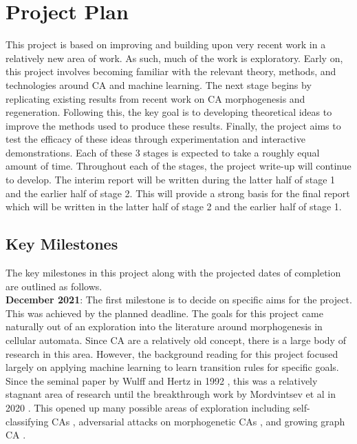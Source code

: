 \chapter{Project Plan}

This project is based on improving and building upon very recent work in a relatively new area of work.
As such, much of the work is exploratory.
Early on, this project involves becoming familiar with the relevant theory, methods, and technologies around CA and machine learning.
The next stage begins by replicating existing results from recent work on CA morphogenesis and regeneration. Following this, the key goal is to developing theoretical ideas to improve the methods used to produce these results.
Finally, the project aims to test the efficacy of these ideas through experimentation and interactive demonstrations.
Each of these 3 stages is expected to take a roughly equal amount of time.
Throughout each of the stages, the project write-up will continue to develop.
The interim report will be written during the latter half of stage 1 and the earlier half of stage 2.
This will provide a strong basis for the final report which will be written in the latter half of stage 2 and the earlier half of stage 1.

\section{Key Milestones}
The key milestones in this project along with the projected dates of completion are outlined as follows.\\

\textbf{December 2021}: The first milestone is to decide on specific aims for the project. 
This was achieved by the planned deadline. 
The goals for this project came naturally out of an exploration into the literature around morphogenesis in cellular automata.
Since CA are a relatively old concept, there is a large body of research in this area.
However, the background reading for this project focused largely on applying machine learning to learn transition rules for specific goals.
Since the seminal paper by Wulff and Hertz in 1992 \cite{wulff1992learning}, this was a relatively stagnant area of research until the breakthrough work by Mordvintsev et al in 2020 \cite{mordvintsev2020growing}.
This opened up many possible areas of exploration including self-classifying CAs \cite{randazzo2020self-classifying}, adversarial attacks on morphogenetic CAs \cite{randazzo2021adversarial}, and growing graph CA \cite{grattarola2021learning}.



